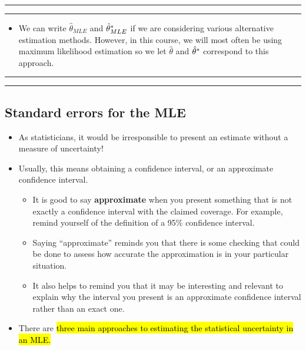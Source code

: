 \documentclass[]{article}
\providecommand{\tightlist}{%
  \setlength{\itemsep}{0pt}\setlength{\parskip}{0pt}}
\begin{document}
\begin{center}\rule{0.5\linewidth}{\linethickness}\end{center}

\begin{center}\rule{0.5\linewidth}{\linethickness}\end{center}

\begin{itemize}
\tightlist
\item
  We can write \(\hat\theta_{MLE}\) and \(\hat\theta_{MLE}^*\)
  if we are considering various alternative estimation methods. However,
  in this course, we will most often be using maximum likelihood
  estimation so we let \(\hat\theta\) and \(\hat\theta^*\)
  correspond to this approach.
\end{itemize}

\begin{center}\rule{0.5\linewidth}{\linethickness}\end{center}

\begin{center}\rule{0.5\linewidth}{\linethickness}\end{center}

\subsection{Standard errors for the
MLE}\label{standard-errors-for-the-mle}

\begin{itemize}
\item
  As statisticians, it would be irresponsible to present an estimate
  without a measure of uncertainty!
\item
  Usually, this means obtaining a confidence interval, or an approximate
  confidence interval.

  \begin{itemize}
  \item
    It is good to say \textbf{approximate} when you present something
    that is not exactly a confidence interval with the claimed coverage.
    For example, remind yourself of the definition of a 95\% confidence
    interval.
  \item
    Saying ``approximate'' reminds you that there is some checking that
    could be done to assess how accurate the approximation is in your
    particular situation.
  \item
    It also helps to remind you that it may be interesting and relevant
    to explain why the interval you present is an approximate confidence
    interval rather than an exact one.
  \end{itemize}
\item
  There are \hl{three main approaches to estimating the statistical
  uncertainty in an MLE.}
\end{itemize}
\end{document}
